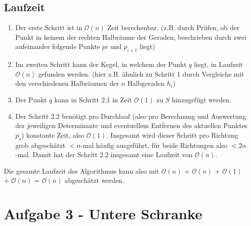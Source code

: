 \documentclass[a4paper]{article}
\begin{document}
\subsection*{Laufzeit}
\begin{enumerate}
\item Der erste Schritt ist in $\mathcal{O}(n)$ Zeit berechenbar. (z.B. durch
Prüfen, ob der Punkt in keinem der rechten Halbräume der Geraden, beschrieben durch
zwei aufeinander folgende Punkte $pi$ und $p_{i+1}$ liegt)
\item Im zweiten Schritt kann der Kegel, in welchem der Punkt $q$ liegt, in Laufzeit
$\mathcal{O}(n)$ gefunden werden. (hier z.B. ähnlich zu Schritt 1 durch Vergleiche 
mit den verschiedenen Halbräumen der $n$ Halbgeraden $h_i$)
\item Der Punkt $q$ kann in Schritt 2.1 in Zeit $\mathcal{O}(1)$ zu $S$ hinzugefügt werden.
\item Der Schritt 2.2 benötigt pro Durchlauf (also pro Berechnung und Auswertung der jeweiligen
Determinante und eventuellem Entfernen des aktuellen Punktes $p_s$) konstante Zeit, also $\mathcal{O}(1)$. Insgesamt wird dieser Schritt pro Richtung grob abgeschätzt $< n$-mal häufig ausgeführt, für beide Richtungen also $< 2n$-mal. Damit hat der Schritt 2.2 insgesamt eine Laufzeit von $\mathcal{O}(n)$.
\end{enumerate}

Die gesamte Laufzeit des Algorithmus kann also mit $\mathcal{O}(n)$ + $\mathcal{O}(n)$ + $\mathcal{O}(1)$ + $\mathcal{O}(n)$ = $\mathcal{O}(n)$ abgeschätzt werden. 



\section*{Aufgabe 3 - Untere Schranke}
\end{document}
